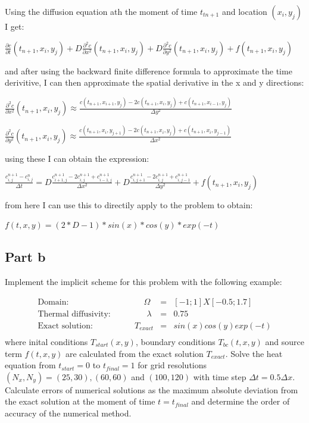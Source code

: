 \documentclass[12pt]{article}
\begin{document}
Using the diffusion equation ath the moment of time $t_{tn+1}$ and location $(x_i, y_j)$ I get:
\begin{center}
$\frac{\partial c}{\partial t} (t_{n+1}, x_i,y_j) + D \frac{\partial ^2 c}{\partial x^2} (t_{n+1}, x_i,y_j) + D \frac{\partial ^2 c}{\partial y^2} (t_{n+1}, x_i,y_j) + f (t_{n+1}, x_i,y_j)$
\end{center}
and after using the backward finite difference formula to approximate the time derivitive, I can then approximate the spatial derivative in the x and y directions:
\begin{center}
$
\frac{\partial ^2 c}{\partial x^2} (t_{n+1}, x_i,y_j) \approx \frac{c(t_{n+1}, x_{i+1},y_j) - 2c(t_{n+1}, x_i,y_j)+c(t_{n+1}, x_{i-1},y_j)}{\Delta y^2}
$
\end{center}
\begin{center}
$
\frac{\partial ^2 c}{\partial y^2} (t_{n+1}, x_i,y_j) \approx \frac{c(t_{n+1}, x_{i},y_{j+1}) - 2c(t_{n+1}, x_i,y_j)+c(t_{n+1}, x_{i},y_{j-1})}{\Delta x^2}
$
\end{center}
using these I can obtain the expression:
\begin{center}
$
\frac{c_{i,j}^{n+1}-c_{i,j}^n}{\Delta t} = D \frac{c_{i+1,j}^{n+1}-2c_{i,j}^{n+1}+c_{i-1,j}^{n+1}}{\Delta x^2} + D \frac{c_{i,j+1}^{n+1}-2c_{i,j}^{n+1}+c_{i,j-1}^{n+1}}{\Delta y^2}+ f(t_{n+1}, x_i, y_j)
$
\end{center}
from here I can use this to directily apply to the problem to obtain:
\begin{center}
$
 f (t,x,y) = (2*D-1)*sin(x)*cos(y)*exp(-t)
$
\end{center}
\newpage
\subsection{Part b}\label{sec::b}
Implement the implicit scheme for this problem with the following example:

\begin{eqnarray}
\textrm{Domain:}\quad \quad \quad \quad \quad \quad \quad \quad \quad \Omega &=& [-1;1]X[-0.5;1.7]  \\\nonumber
\textrm{Thermal diffusivity: }\quad \quad \quad \quad \lambda &=& 0.75\\\nonumber
\textrm{Exact solution:}\quad \quad \quad \quad  \quad T_{exact}&=&sin(x)cos(y)exp(-t) \\\nonumber
\end{eqnarray}
where inital conditions $T_{start}(x,y)$, boundary conditions $T_{bc}(t,x,y)$ and source term $f(t,x,y)$ are calculated from the exact solution $T_{exact}$.  Solve the heat equation from $t_{start}=0$ to $t_{final}=1$ for grid resolutions $(N_x,N_y)=(25,30), (60,60)$ and $(100,120)$ with time step $\Delta t=0.5 \Delta x$.  Calculate errors of numerical solutions as the maximum absolute deviation from the exact solution at the moment of time $t=t_{final}$ and determine the order of accuracy of the numerical method.
\end{document}
